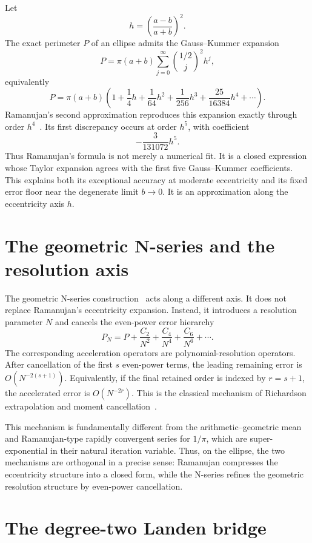 \documentclass[11pt]{article}
\begin{document}
Let
\[
h=\left(\frac{a-b}{a+b}\right)^2.
\]
The exact perimeter $P$ of an ellipse admits the Gauss--Kummer expansion
\[
P=\pi(a+b)\sum_{j=0}^{\infty}
\binom{1/2}{j}^{\!2} h^j,
\]
equivalently
\[
P=\pi(a+b)\left(
1+\frac14 h+\frac{1}{64}h^2+\frac{1}{256}h^3+\frac{25}{16384}h^4+\cdots
\right).
\]
Ramanujan's second approximation reproduces this expansion exactly through order
$h^4$~\cite{berndt1991}. Its first discrepancy occurs at order $h^5$, with
coefficient
\[
-\frac{3}{131072}h^5.
\]
Thus Ramanujan's formula is not merely a numerical fit. It is a closed
expression whose Taylor expansion agrees with the first five Gauss--Kummer
coefficients. This explains both its exceptional accuracy at moderate
eccentricity and its fixed error floor near the degenerate limit $b\to0$. It is
an approximation along the eccentricity axis $h$.

\section{The geometric N-series and the resolution axis}

The geometric N-series construction~\cite{BakerNSeries2026} acts along a different axis. It does not
replace Ramanujan's eccentricity expansion. Instead, it introduces a resolution
parameter $N$ and cancels the even-power error hierarchy
\[
P_N=P+\frac{C_2}{N^2}+\frac{C_4}{N^4}+\frac{C_6}{N^6}+\cdots.
\]
The corresponding acceleration operators are polynomial-resolution operators.
After cancellation of the first $s$ even-power terms, the leading remaining error
is $O(N^{-2(s+1)})$. Equivalently, if the final retained order is indexed by
$r=s+1$, the accelerated error is $O(N^{-2r})$. This is the classical mechanism
of Richardson extrapolation and moment cancellation~\cite{richardson1911,trefethen2014}.

This mechanism is fundamentally different from the arithmetic--geometric mean and
Ramanujan-type rapidly convergent series for $1/\pi$, which are super-exponential
in their natural iteration variable. Thus, on the ellipse, the two mechanisms are
orthogonal in a precise sense: Ramanujan compresses the eccentricity structure
into a closed form, while the N-series refines the geometric resolution structure
by even-power cancellation.

\section{The degree-two Landen bridge}
\end{document}
